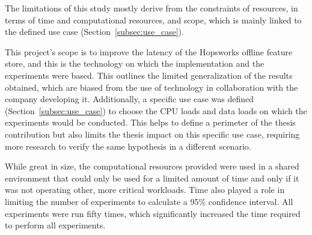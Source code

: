 The limitations of this study mostly derive from the constraints of resources, in terms of time and computational resources, and scope, which is mainly linked to the defined use case (Section~\ref{subsec:use_case}). 

This project's scope is to improve the latency of the Hopsworks offline feature store, and this is the technology on which the implementation and the experiments were based. This outlines the limited generalization of the results obtained, which are biased from the use of technology in collaboration with the company developing it. Additionally, a specific use case was defined (Section~\ref{subsec:use_case}) to choose the \gls{CPU} loads and data loads on which the experiments would be conducted. This helps to define a perimeter of the thesis contribution but also limits the thesis impact on this specific use case, requiring more research to verify the same hypothesis in a different scenario.

While great in size, the computational resources provided were used in a shared environment that could only be used for a limited amount of time and only if it was not operating other, more critical workloads. Time also played a role in limiting the number of experiments to calculate a 95\% confidence interval. All experiments were run fifty times, which significantly increased the time required to perform all experiments. 